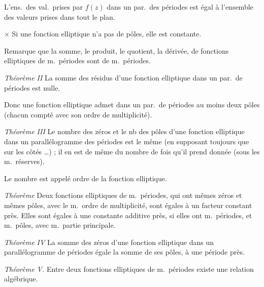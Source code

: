\documentclass[11pt,a4paper]{article}
\begin{document}
L'ens.\ des val.\ prises par $f(z)$ dans un par.\ des périodes est égal à
l'ensemble des valeurs prises dans tout le plan.

$\times$ Si une fonction elliptique n'a pas de pôles, elle est constante.

Remarque que la somme, le produit, le quotient, la dérivée, de fonctions
elliptiques de m.\ périodes sont de m.\ périodes.

\emph{Théorème II} La somme des résidus d'une fonction elliptique dans un par.\
de périodes est nulle.

Donc une fonction elliptique admet dans un par.\ de périodes au moins
deux pôles (chacun compté avec son ordre de multiplicité).

\emph{Théorème III} Le nombre des zéros et le nb des pôles d'une
fonction elliptique dans un parallélogramme des périodes est le même (en
supposant toujours que sur les côtés \ldots) ; il en est de même du nombre de
fois qu'il prend \struck{la valeur} \add{une valeur} donnée (sous les m.\
réserves).

Le nombre est appelé ordre de la fonction elliptique.

\emph{Théorème \ill{}} Deux fonctions elliptiques de m.\ périodes, qui ont mêmes
zéros et mêmes pôles, avec le m.\ ordre de multiplicité, sont égales à un
facteur constant près. Elles sont égales à une constante additive près, si elles
ont m.\ périodes, et m.\ pôles, avec m.\ partie principale.

\emph{Théorème IV} La somme des zéros d'une fonction  elliptique
dans un parallélogramme de périodes égale la somme de ses pôles, à une période
près.

\emph{Théorème V.} Entre deux fonctions elliptiques de m.\ périodes existe une
relation algébrique.
\end{document}

